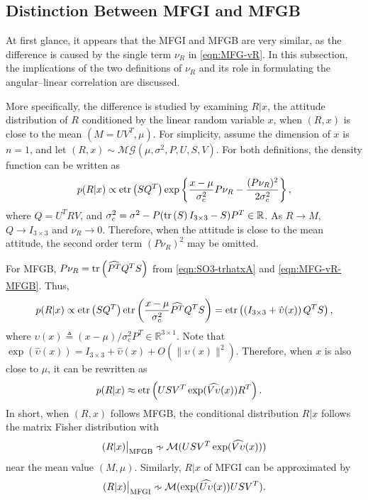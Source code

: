 \subsection{Distinction Between MFGI and MFGB} \label{section:MFG-MFGI-MFGB}

At first glance, it appears that the MFGI and MFGB are very similar, as the difference is caused by the single term $\nu_R$ in \eqref{eqn:MFG-vR}.
In this subsection, the implications of the two definitions of $\nu_R$ and its role in formulating the angular--linear correlation are discussed.

More specifically, the difference is studied by examining $R|x$, the attitude distribution of $R$ conditioned by the linear random variable $x$, when $(R,x)$ is close to the mean $(M=UV^T, \mu)$.
For simplicity, assume the dimension of $x$ is $n=1$, and let $(R,x) \sim \mathcal{MG}(\mu,\allowbreak \sigma^2,\allowbreak P,\allowbreak U,\allowbreak S,\allowbreak V)$.
For both definitions, the density function can be written as
\begin{align*}
	p(R|x) \propto \mathrm{etr}\left( SQ^T \right) \exp\left\{ \frac{x-\mu}{\sigma_c^2}P\nu_R - \frac{(P\nu_R)^2}{2\sigma_c^2} \right\},
\end{align*}
where $Q = U^TRV$, and $\sigma_c^2 = \sigma^2 - P(\mathrm{tr}\left( S \right)I_{3\times 3}-S)P^T\in\mathbb{R}$.
As $R\rightarrow M$, $Q\rightarrow I_{3\times 3}$ and $\nu_R \rightarrow 0$.
Therefore, when the attitude is close to the mean attitude, the second order term $(P\nu_R)^2$ may be omitted.

For MFGB, $P\nu_R = \mathrm{tr}\left( \widehat{P^T} Q^TS \right)$ from \eqref{eqn:SO3-trhatxA} and \eqref{eqn:MFG-vR-MFGB}.
Thus,
\begin{align*} 
	p(R|x) \propto \mathrm{etr}\left( SQ^T \right) \mathrm{etr}\left( \frac{x-\mu}{\sigma_c^2} \widehat{P^T} Q^TS \right) = \mathrm{etr}\left( \left(I_{3\times 3} + \hat{\upsilon}(x)\right) Q^TS \right),
\end{align*}
where $\upsilon(x) \triangleq (x-\mu)/\sigma_c^2 P^T \in \mathbb{R}^{3\times 1}$.
Note that $\exp(\hat\upsilon(x))=I_{3\times 3} + \hat\upsilon(x) + O(\|\upsilon(x)\|^2)$.
Therefore, when $x$ is also close to $\mu$, it can be rewritten as
\begin{align*}
	p(R|x) &\approx \mathrm{etr}\left( USV^T\exp(\widehat{V\upsilon}(x))R^T \right).
\end{align*}
In short, when $(R,x)$ follows MFGB, the conditional distribution $R|x$ follows the matrix Fisher distribution with
\begin{align} \label{eqn:MFG-p(R|x)-MFGB}
	(R|x)\big|_{\text{MFGB}} \approxsim \mathcal{M}(USV^T\exp(\widehat{V\upsilon}(x))) 
\end{align}
near the mean value $(M,\mu)$. 
Similarly, $R|x$ of MFGI can be approximated by
\begin{align} \label{eqn:MFG-p(R|x)-MFGI}
	(R|x)\big|_\text{MFGI} \approxsim \mathcal{M}(\exp(\widehat{U\upsilon}(x))USV^T).
\end{align}

